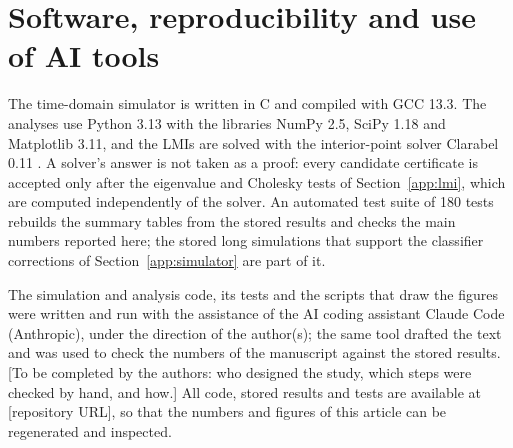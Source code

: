 \section{Software, reproducibility and use of AI tools}\label{app:software}

The time-domain simulator is written in C and compiled with GCC 13.3. The analyses use Python 3.13 with the libraries NumPy 2.5, SciPy 1.18 and Matplotlib 3.11, and the LMIs are solved with the interior-point solver Clarabel 0.11 \citep{goulart2024clarabel}. A solver's answer is not taken as a proof: every candidate certificate is accepted only after the eigenvalue and Cholesky tests of Section~\ref{app:lmi}, which are computed independently of the solver. An automated test suite of 180 tests rebuilds the summary tables from the stored results and checks the main numbers reported here; the stored long simulations that support the classifier corrections of Section~\ref{app:simulator} are part of it.

The simulation and analysis code, its tests and the scripts that draw the figures were written and run with the assistance of the AI coding assistant Claude Code (Anthropic), under the direction of the author(s); the same tool drafted the text and was used to check the numbers of the manuscript against the stored results. [To be completed by the authors: who designed the study, which steps were checked by hand, and how.] All code, stored results and tests are available at [repository URL], so that the numbers and figures of this article can be regenerated and inspected.

